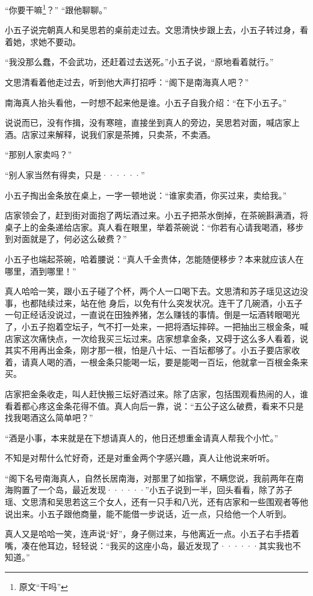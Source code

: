 “你要干嘛\footnote{原文“干吗”}？” “跟他聊聊。”

小五子说完朝真人和吴思若的桌前走过去。文思清快步跟上去，小五子转过身，看着她，求她不要动。

“我没那么蠢，不会武功，还赶着过去送死。”小五子说，“原地看着就行。”

文思清看着他走过去，听到他大声打招呼：“阁下是南海真人吧？”

南海真人抬头看他，一时想不起来他是谁。小五子自我介绍：“在下小五子。”

说说而已，没有作揖，没有寒暄，直接坐到真人的旁边，吴思若对面，喊店家上酒。店家过来解释，说我们家是茶摊，只卖茶，不卖酒。

“那别人家卖吗？”

“别人家当然有得卖，只是······”

小五子掏出金条放在桌上，一字一顿地说：“谁家卖酒，你买过来，卖给我。”

店家领会了，赶到街对面抱了两坛酒过来。小五子把茶水倒掉，在茶碗斟满酒，将桌子上的金条递给店家。真人看在眼里，举着茶碗说：“你若有心请我喝酒，移步到对面就是了，何必这么破费？”

小五子也端起茶碗，哈着腰说：“真人千金贵体，怎能随便移步？本来就应该人在哪里，酒到哪里！”

真人哈哈一笑，跟小五子碰了个杯，两个人一口喝下去。文思清和苏子瑶见这边没事，也都陆续过来，站在他
身后，以免有什么突发状况。连干了几碗酒，小五子一句正经话没说过，一直说在田独养猪，怎么赚钱的事情。倒是一坛酒转眼喝光了，小五子抱着空坛子，气不打一处来，一把将酒坛摔碎。一把抽出三根金条，喊店家这次痛快点，一次给我买三坛过来。店家想拿金条，又碍于这么多人看着，说其实不用再出金条，刚才那一根，怕是八十坛、一百坛都够了。小五子要店家收着，请真人喝的酒，一根金条只能喝一坛，要是能喝一百坛，他就拿一百根金条来买。

店家把金条收走，叫人赶快搬三坛好酒过来。除了店家，包括围观看热闹的人，谁看着都心疼这金条花得不值。真人向后一靠，说：“五公子这么破费，看来不只是找我喝酒这么简单吧？”

“酒是小事，本来就是在下想请真人的，他日还想重金请真人帮我个小忙。”

不知是对帮什么忙好奇，还是对重金两个字感兴趣，真人让他说来听听。

“阁下名号南海真人，自然长居南海，对那里了如指掌，不瞒您说，我前两年在南海购置了一个岛，最近发现······”小五子说到一半，回头看看，除了苏子瑶、文思清和吴思若这三个女人，还有一只手和八光，还有店家和一些围观者等他说出来。小五子跟他商量，能不能借一步说话，近一点，只给他一个人听到。

真人又是哈哈一笑，连声说“好”，身子侧过来，与他离近一点。小五子右手捂着嘴，凑在他耳边，轻轻说：“我买的这座小岛，最近发现了······其实我也不知道。”

